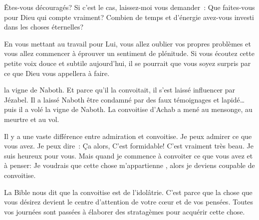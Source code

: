 Êtes-vous découragés? Si c'est le cas, laissez-moi vous demander~:
 Que faites-vous pour Dieu qui compte vraiment?
 Combien de temps et d'énergie avez-vous investi dans les choses éternelles?


En vous mettant au travail pour Lui, vous allez oublier vos propres problèmes
 et vous allez commencer à éprouver un sentiment de plénitude.
 Si vous écoutez cette petite voix douce et subtile aujourd'hui,
 il se pourrait que vous soyez surpris par ce que Dieu vous appellera à faire. 

\dvrule






 la vigne de Naboth.
 Et parce qu'il la convoitait, il s'est laissé influencer par Jézabel.
 Il a laissé Naboth être condamné par des faux témoignages et lapidé\dots{}
 puis il a volé la vigne de Naboth.
 La convoitise d'Achab a mené au mensonge, au meurtre et au vol.

Il y a une vaste différence entre admiration et convoitise.
 Je peux admirer ce que vous avez. Je peux dire~:
 \og Ça alors, C'est formidable! C'est vraiment très beau.
 Je suis heureux pour vous. \fg{}
 Mais quand je commence à convoiter ce que vous avez et à penser:
 \og Je voudrais que cette chose m'appartienne \fg{},
 alors je deviens coupable de convoitise. 


La Bible nous dit que la convoitise est de l'idolâtrie.
 C'est parce que la chose que vous désirez devient le centre d'attention
 de votre c\oe{}ur et de vos pensées.
 Toutes vos journées sont passées à élaborer des stratagèmes
 pour acquérir cette chose. 

